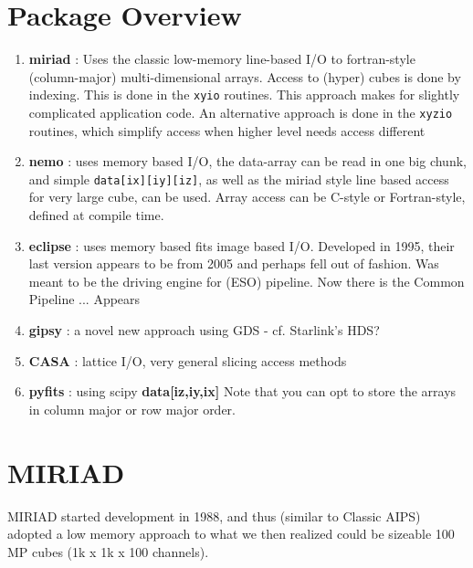 \documentclass[preprint]{aastex} %
\begin{document}
\section{Package Overview}



\begin{enumerate}

\item  {\bf miriad} : Uses the classic low-memory line-based I/O 
to fortran-style (column-major) multi-dimensional arrays. Access
to (hyper) cubes is done by indexing. This is done in the
{\tt xyio} routines.   This approach makes for slightly complicated
application code.
An alternative approach is done in the 
{\tt xyzio} routines, which simplify access when higher level needs
access different


\item  {\bf nemo} : uses memory based I/O, the data-array can be read
in one big chunk, and simple {\tt data[ix][iy][iz]}, as well as the
miriad style line based access for very large cube, can be used. 
Array access can be C-style or Fortran-style, defined at compile
time.


\item  {\bf eclipse} : uses memory based fits image based
I/O. Developed in 1995, their last version appears to
be from 2005 and perhaps fell out of fashion. Was meant to be the driving
engine for (ESO) pipeline. Now there is the Common Pipeline ...
Appears 


\item  {\bf gipsy} : a novel new approach using GDS - cf. Starlink's HDS?

\item  {\bf CASA} : lattice I/O, very general slicing access methods

\item {\bf pyfits} : using scipy {\bf data[iz,iy,ix]}
Note that you can opt to store the arrays in column major or row major order.


\end{enumerate}



\section{MIRIAD}

MIRIAD started development in 1988, and thus (similar to Classic AIPS)
adopted a low memory approach
to what we then realized could be sizeable 100 MP 
cubes (1k x 1k x 100 channels). 
\end{document}
